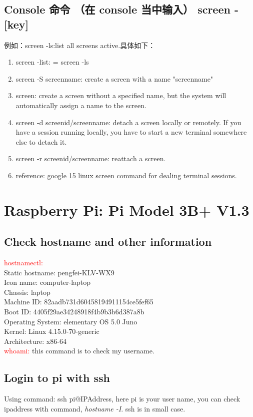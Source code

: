 \documentclass[UTF8,fancyhdr,a4paper]{ctexart}
\begin{document}
\subsection{Console 命令 （在 console 当中输入） screen -[key]}
例如：screen -ls:list all screens active.具体如下：
\begin{enumerate}
\item screen -list: = screen -ls
\item screen -S screenname: create a screen with a name "screenname"
\item screen: create a screen without a specified name, but the system will automatically assign a name to the screen.
\item screen -d screenid/screenname: detach a screen locally or remotely. If you have a session running locally, you have to start a new terminal somewhere else to detach it.
\item screen -r screenid/screenname: reattach a screen.
\item reference: google 15 linux screen command for dealing terminal sessions.
\end{enumerate}

\section{Raspberry Pi: Pi Model 3B+ V1.3}
\subsection{Check hostname and other information}
\textcolor{red}{hostnamectl:}\\
   Static hostname: pengfei-KLV-WX9\\
         Icon name: computer-laptop\\
           Chassis: laptop\\
        Machine ID: 82aadb731d60458194911154ce5fef65\\
           Boot ID: 4405f29ae34248918f4b9b3b6d387a8b\\
  Operating System: elementary OS 5.0 Juno\\
            Kernel: Linux 4.15.0-70-generic\\
      Architecture: x86-64\\
\textcolor{red}{whoami:} this command is to check my username.
\subsection{Login to pi with ssh}
Using command: ssh pi@IPAddress, here pi is your user name, you can check ipaddress with command, \textit{hostname -I}. ssh is in small case.
\end{document}
